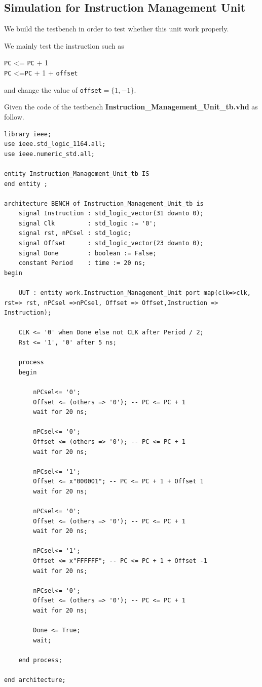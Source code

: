 \subsection{Simulation for Instruction Management Unit}
\label{sec:Simulation for Instruction Management Unit}

We build the testbench in order to test whether this unit work properly.


We mainly test the instruction such as
\begin{center}
        \texttt{PC} <= \texttt{PC} + 1 \\
        \texttt{PC} <=\texttt{PC} + 1 + \texttt{offset}
\end{center}
and change the value of \texttt{offset}$=\{1,-1\}$.

Given the code of the testbench \textbf{Instruction\_Management\_Unit\_tb.vhd} as follow.
\begin{lstlisting}[style=vhdl,columns=fixed, breaklines]
library ieee;
use ieee.std_logic_1164.all;
use ieee.numeric_std.all;

entity Instruction_Management_Unit_tb IS  
end entity ;
    
architecture BENCH of Instruction_Management_Unit_tb is
    signal Instruction : std_logic_vector(31 downto 0);
    signal Clk         : std_logic := '0';
    signal rst, nPCsel : std_logic;
    signal Offset      : std_logic_vector(23 downto 0);
    signal Done        : boolean := False; 
    constant Period    : time := 20 ns;
begin
    
    UUT : entity work.Instruction_Management_Unit port map(clk=>clk, rst=> rst, nPCsel =>nPCsel, Offset => Offset,Instruction => Instruction); 
    
    CLK <= '0' when Done else not CLK after Period / 2;
    Rst <= '1', '0' after 5 ns; 
    
    process
    begin
        
        nPCsel<= '0'; 
        Offset <= (others => '0'); -- PC <= PC + 1 
        wait for 20 ns;
        
        nPCsel<= '0'; 
        Offset <= (others => '0'); -- PC <= PC + 1 
        wait for 20 ns;
        
        nPCsel<= '1'; 
        Offset <= x"000001"; -- PC <= PC + 1 + Offset 1 
        wait for 20 ns;
        
        nPCsel<= '0'; 
        Offset <= (others => '0'); -- PC <= PC + 1
        wait for 20 ns;
        
        nPCsel<= '1'; 
        Offset <= x"FFFFFF"; -- PC <= PC + 1 + Offset -1 
        wait for 20 ns;
        
        nPCsel<= '0'; 
        Offset <= (others => '0'); -- PC <= PC + 1 
        wait for 20 ns;
        
        Done <= True; 
        wait;
        
    end process;
    
end architecture;    
\end{lstlisting}

